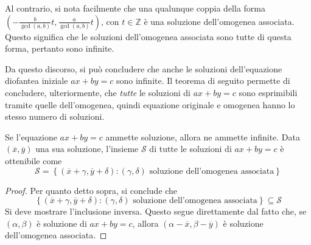 \documentclass[11pt, a4paper]{scrartcl}
\theoremstyle{definition}
\numberwithin{esempio}{section}
\theoremstyle{definition}
\numberwithin{obs}{section}
\numberwithin{nota}{section}
\numberwithin{equation}{subsection}
\begin{document}
Al contrario, si nota facilmente che una qualunque coppia della forma $\left( - \frac{b}{\operatorname{gcd}(a,b) }t , \frac{a}{\operatorname{gcd}(a,b) }t\right)$, con $ t \in \mathbb{Z} $ \`e una soluzione dell'omogenea associata. 
Questo significa che le soluzioni dell'omogenea associata sono tutte di questa forma, pertanto sono infinite.

Da questo discorso, si pu\`o concludere che anche le soluzioni dell'equazione diofantea iniziale $ax + by = c$ sono infinite. 
Il teorema di seguito permette di concludere, ulteriormente, che \textit{tutte} le soluzioni di $ax + by = c$ sono esprimibili tramite quelle dell'omogenea, quindi equazione originale e omogenea hanno lo stesso numero di soluzioni.
\begin{teorema}
	{}{}
	Se l'equazione $ax + by = c$ ammette soluzione, allora ne ammette infinite. Data $(\overline{x}, \overline{y})$ una sua soluzione, l'insieme $\mathcal{S} $ di tutte le soluzioni di $ax +by = c$ \`e ottenibile come
	\[
	\mathcal{S}  = \left\{ (\overline{x}+\gamma, \overline{y}+\delta ) : (\gamma, \delta ) \text{ soluzione dell'omogenea associata}\right\} 
	\] 
	\begin{proof}
		Per quanto detto sopra, si conclude che 
		\[
		\left\{(\overline{x}+\gamma, \overline{y}+\delta ) : (\gamma, \delta ) \text{ soluzione dell'omogenea associata}  \right\} \subseteq \mathcal{S} 
		\] 
		Si deve mostrare l'inclusione inversa.
		Questo segue direttamente dal fatto che, se $(\alpha ,\beta )$ \`e soluzione di $ax + by = c$, allora $(\alpha -\overline{x}, \beta - \overline{y})$ \`e soluzione dell'omogenea associata.
	\end{proof}
\end{teorema}
\end{document}
